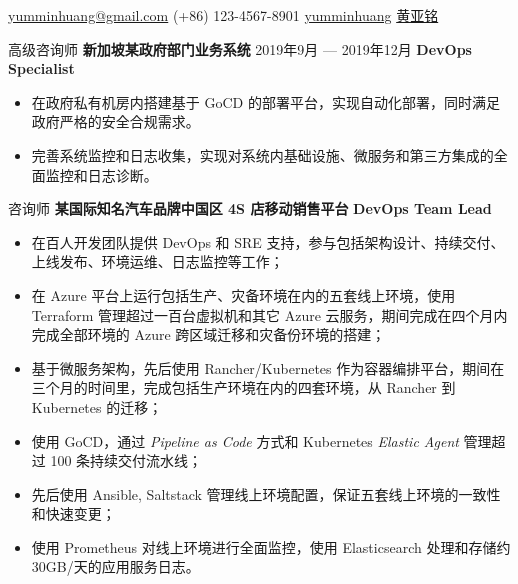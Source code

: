 \documentclass{resume}
\begin{document}
{\href{mailto:yumminhuang@gmail.com}{yumminhuang@gmail.com}}
{(+86) 123-4567-8901}
{\href{https://github.com/yumminhuang}{yumminhuang}}
{\href{https://www.linkedin.com/in/yaming-huang-6a09325b/zh-cn}{黄亚铭}}
{}

\begin{body}
	{高级咨询师}{}
	\textbf{新加坡某政府部门业务系统} \hfill{2019年9月 --- 2019年12月} \textbf{DevOps Specialist}
	\begin{itemize}[noitemsep,topsep=0pt]
		\item 在政府私有机房内搭建基于 GoCD 的部署平台，实现自动化部署，同时满足政府严格的安全合规需求。
		\item 完善系统监控和日志收集，实现对系统内基础设施、微服务和第三方集成的全面监控和日志诊断。
	\end{itemize}
	{咨询师}{}
	\textbf{某国际知名汽车品牌中国区 4S 店移动销售平台} \hfill{} \textbf{DevOps Team Lead}
	\begin{itemize}[noitemsep,topsep=0pt]
		\item 在百人开发团队提供 DevOps 和 SRE 支持，参与包括架构设计、持续交付、上线发布、环境运维、日志监控等工作；
		\item 在 Azure 平台上运行包括生产、灾备环境在内的五套线上环境，使用 Terraform 管理超过一百台虚拟机和其它 Azure 云服务，期间完成在四个月内完成全部环境的 Azure 跨区域迁移和灾备份环境的搭建；
		\item 基于微服务架构，先后使用 Rancher/Kubernetes 作为容器编排平台，期间在三个月的时间里，完成包括生产环境在内的四套环境，从 Rancher 到 Kubernetes 的迁移；
		\item 使用 GoCD，通过 \textit{Pipeline as Code} 方式和 Kubernetes \textit{Elastic Agent} 管理超过 100 条持续交付流水线；
		\item 先后使用 Ansible, Saltstack 管理线上环境配置，保证五套线上环境的一致性和快速变更；
		\item 使用 Prometheus 对线上环境进行全面监控，使用 Elasticsearch 处理和存储约 30GB/天的应用服务日志。
	\end{itemize}
\end{body}
\end{document}

